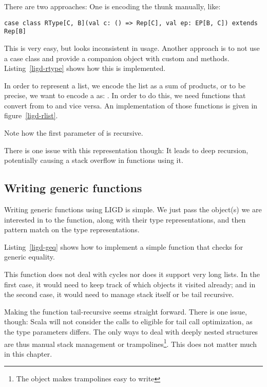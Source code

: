 There are two approaches: One is encoding the thunk manually, like:
\begin{lstlisting}[gobble=2]
  case class RType[C, B](val c: () => Rep[C], val ep: EP[B, C]) extends Rep[B]
\end{lstlisting}
This is very easy, but looks inconsistent in usage. Another approach is to
not use a case class and provide a companion object with custom 
and  methods. Listing~\ref{ligd-rtype} shows how this is
implemented.


\begin{example}[Lists]
In order to represent a list, we encode the
list as a sum of products, or to be precise, we want to encode a 
as: . In order to do this, we need functions
that convert from  to  and
vice versa. An implementation of those functions is given in figure~\ref{ligd-rlist}.
%



Note how the first parameter of  is recursive.

There is one issue with this representation though: It leads to deep recursion,
potentially causing a stack overflow in functions using it.
\end{example}

\subsection{Writing generic functions}
Writing generic functions using LIGD is simple. We just pass the object(s)
we are interested in to the function, along with their type representations,
and then pattern match on the type representations.

\begin{example}
Listing~\ref{ligd-geq} shows how to implement a simple function that checks for
generic equality.

  

This function does not deal with cycles nor does it support very long lists. In
the first case, it would need to keep track of which objects it visited already;
and in the second case, it would need to manage stack itself or be tail recursive.

Making the function tail-recursive seems straight forward. There is one issue,
though: Scala will not consider the calls to  eligible for tail call
optimization, as the type parameters differs. The only ways to deal with deeply
nested structures are thus manual stack management or trampolines\footnote{The
 object makes trampolines easy to write}. This
does not matter much in this chapter.
\end{example}


